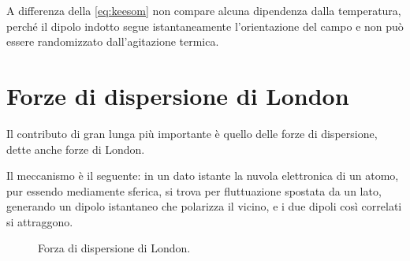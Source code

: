 A differenza della \eqref{eq:keesom} non compare alcuna dipendenza dalla temperatura, perché il dipolo indotto segue istantaneamente l'orientazione del campo e non può essere randomizzato dall'agitazione termica.

\newpage

\section{Forze di dispersione di London}

Il contributo di gran lunga più importante è quello delle forze di dispersione, dette anche forze di London.

Il meccanismo è il seguente: in un dato istante la nuvola elettronica di un atomo, pur essendo mediamente sferica, si trova per fluttuazione spostata da un lato, generando un dipolo istantaneo che polarizza il vicino, e i due dipoli così correlati si attraggono.

\begin{figure}[htbp]
    \centering
    \caption{Forza di dispersione di London.}
    \label{fig:dispersione}
\end{figure}


